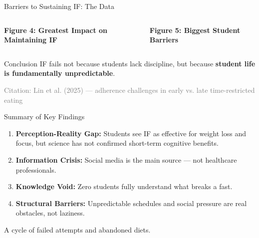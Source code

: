 \documentclass[aspectratio=169, 12pt]{beamer}
\begin{document}
\begin{frame}{Barriers to Sustaining IF: The Data}
  \begin{columns}[T]
    \textbf{Figure 4: Greatest Impact on Maintaining IF}
    \begin{center}
    \end{center}
    
    \textbf{Figure 5: Biggest Student Barriers}
    \begin{center}
    \end{center}
  \end{columns}
  
  \vspace{0.3cm}
  \begin{block}{Conclusion}
    IF fails not because students lack discipline, but because \textbf{student life is fundamentally unpredictable}.
  \end{block}
  
  \tiny \textcolor{gray}{Citation: Lin et al. (2025) — adherence challenges in early vs. late time-restricted eating}
\end{frame}

\begin{frame}{Summary of Key Findings}
  \begin{enumerate}
    \item \textbf{Perception-Reality Gap:} Students see IF as effective for weight loss and focus, but science has not confirmed short-term cognitive benefits.
    \pause
    \item \textbf{Information Crisis:} \textcolor{accentRed}{Social media} is the main source — not healthcare professionals.
    \pause
    \item \textbf{Knowledge Void:} \textcolor{accentRed}{Zero} students fully understand what breaks a fast.
    \pause
    \item \textbf{Structural Barriers:} Unpredictable schedules and social pressure are real obstacles, not laziness.
  \end{enumerate}
  
  \vspace{0.5cm}
  \begin{center}
    \large \textcolor{hkuDark}{A cycle of failed attempts and abandoned diets.}
  \end{center}
\end{frame}
\end{document}
